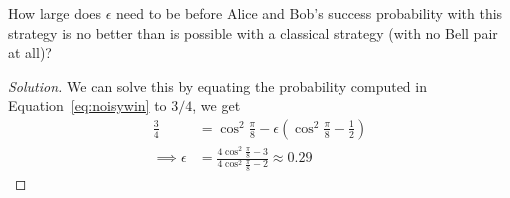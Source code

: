 \begin{solution}[label=ques:4b]
  \begin{question}
    How large does $\epsilon$ need to be before Alice and Bob's success probability with this strategy is no better than is possible with a classical strategy (with no Bell pair at all)?
  \end{question}
  \tcblower{}
  \begin{proof}[Solution]
    We can solve this by equating the probability computed in Equation~\ref{eq:noisywin} to $3/4$, we get
    \begin{equation}
      \begin{split}
        \frac{3}{4} &= \cos^2\frac{\pi}{8} - \epsilon\left(\cos^2\frac{\pi}{8} - \frac{1}{2}\right)\\
        \implies \epsilon &= \frac{4\cos^2\frac{\pi}{8} - 3}{4\cos^2\frac{\pi}{8} - 2} \approx 0.29
      \end{split}
      \label{eq:verynoisy}
    \end{equation}
  \end{proof}
\end{solution}
